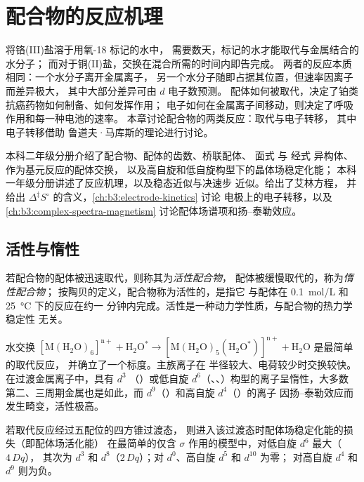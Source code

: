 \chapter{配合物的反应机理}\label{ch:b3:complex-mechanisms}

将铬(III)盐溶于用氧-18 标记的水中，
需要数天，标记的水才能取代与金属结合的水分子；
而对于铜(II)盐，交换在混合所需的时间内即告完成。
两者的反应本质相同：一个水分子离开金属离子，
另一个水分子随即占据其位置，但速率因离子而差异极大，
其中大部分差异可由 $d$ 电子数预测。
配体如何被取代，决定了铂类抗癌药物如何制备、如何发挥作用；
电子如何在金属离子间移动，则决定了呼吸作用和每一种电池的速率。
本章讨论配合物的两类反应：取代与电子转移，
其中电子转移借助
鲁道夫·马库斯的理论进行讨论。

\begin{recall}
本科二年级分册介绍了配合物、配体的齿数、桥联配体、
$面式$ 与 $经式$ 异构体、作为基元反应的配体交换，
以及高自旋和低自旋构型下的晶体场稳定化能；
本科一年级分册讲述了反应机理，以及稳态近似与决速步
近似。给出了艾林方程，
并给出 $\Delta^{\ddagger}S^\circ$ 的含义，\cref{ch:b3:electrode-kinetics} 讨论
电极上的电子转移，以及\cref{ch:b3:complex-spectra-magnetism}
讨论配体场谱项和扬–泰勒效应。
\end{recall}

\section{活性与惰性}

\begin{definition}[活性配合物与惰性配合物]\label{def:b3:complex-mechanisms:labile}
若配合物的配体被迅速取代，则称其为\emph{活性配合物}，
配体被缓慢取代的，称为\emph{惰性配合物}；
按陶贝的定义，配合物称为活性的，是指它
与配体在 \qty{0.1}{mol/L} 和 \qty{25}{\celsius} 下的反应在约一
分钟内完成。活性是一种动力学性质，与配合物的热力学稳定性
无关。
\end{definition}

水交换 $\mathrm{[M(H_2O)_6]^{n+} + H_2O^{\ast} \to [M(H_2O)_5(H_2O^{\ast})]^{n+} + H_2O}$ 是最简单的取代反应，
并确立了一个标度。主族离子在
半径较大、电荷较少时交换较快。在过渡金属离子中，具有 $d^3$
（）或低自旋 $d^6$（、、）构型的离子呈惰性，大多数
第二、三周期金属也是如此，而 $d^9$（）和高自旋 $d^4$（）的离子
因扬–泰勒效应而发生畸变，活性极高。

\begin{proposition}[配体场活化能]\label{prop:b3:complex-mechanisms:lfae}
若取代反应经过五配位的四方锥过渡态，
则进入该过渡态时配体场稳定化能的损失（即配体场活化能）
在最简单的仅含 $\sigma$ 作用的模型中，对低自旋 $d^6$ 最大（$4\,Dq$），
其次为 $d^3$ 和 $d^8$（$2\,Dq$）；对 $d^0$、高自旋 $d^5$ 和 $d^{10}$ 为零；
对高自旋 $d^4$ 和 $d^9$ 则为负。
\end{proposition}

